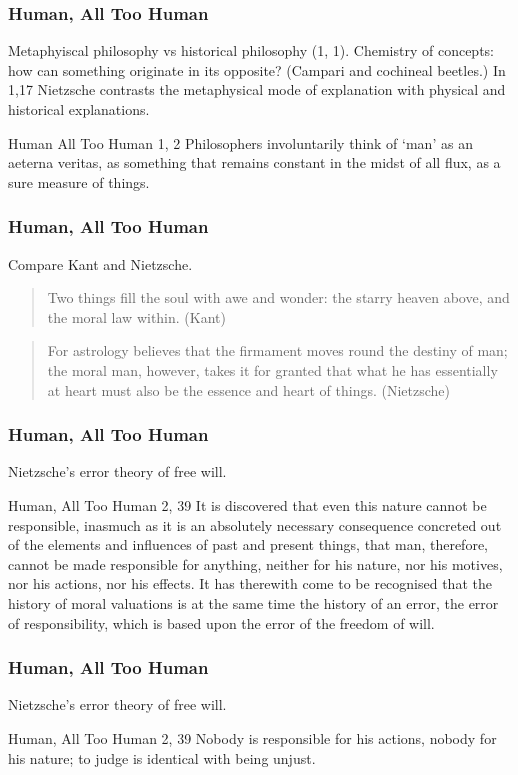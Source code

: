 \documentclass[xcolor=dvipsnames]{beamer}
\begin{document}
\begin{frame}
  \frametitle{Human, All Too Human}
  Metaphyiscal philosophy vs historical philosophy (1, 1). Chemistry of
  concepts: how can something originate in its opposite? (Campari and
  cochineal beetles.) In 1,17 Nietzsche contrasts the metaphysical
  mode of explanation with physical and historical explanations.
  \begin{block}{Human All Too Human 1, 2}
    Philosophers involuntarily think of `man' as an aeterna veritas,
    as something that remains constant in the midst of all flux, as a
    sure measure of things.
  \end{block}
\end{frame}

\begin{frame}
  \frametitle{Human, All Too Human}
  Compare Kant and Nietzsche.
  \begin{quote}
    Two things fill the soul with awe and wonder: the starry heaven
    above, and the moral law within. (Kant)
  \end{quote}
  \begin{quote}
    For astrology believes that the firmament moves round the destiny
    of man; the moral man, however, takes it for granted that what he
    has essentially at heart must also be the essence and heart of
    things. (Nietzsche)
  \end{quote}
\end{frame}

\begin{frame}
  \frametitle{Human, All Too Human}
  Nietzsche's error theory of free will.
  \begin{block}{Human, All Too Human 2, 39}
    It is discovered that even this nature cannot be responsible,
    inasmuch as it is an absolutely necessary consequence concreted
    out of the elements and influences of past and present things,
    that man, therefore, cannot be made responsible for anything,
    neither for his nature, nor his motives, nor his actions, nor his
    effects. It has therewith come to be recognised that the history
    of moral valuations is at the same time the history of an error,
    the error of responsibility, which is based upon the error of the
    freedom of will.
  \end{block}
\end{frame}

\begin{frame}
  \frametitle{Human, All Too Human}
  Nietzsche's error theory of free will.
  \begin{block}{Human, All Too Human 2, 39}
    Nobody is responsible for his actions, nobody for his nature; to
    judge is identical with being unjust.
  \end{block}
\end{frame}
\end{document}
